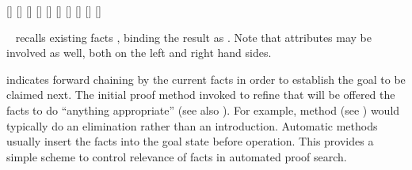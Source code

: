 \begin{isabellebody}
\begin{isamarkuptext}
  \begin{railoutput}
[]
\rail@plus
\rail@bar
{}
[]
\rail@endbar
{}[]
[]
\rail@endplus
\rail@end
{}
\rail@bar
{}[]
[]
[]
[]
\rail@endbar
\rail@plus
{}[]
[]
\rail@endplus
\rail@end
\end{railoutput}


  \begin{description}

  \item \hyperlink{command.note}{\mbox{}}~ recalls existing facts
  , binding the result as .  Note that
  attributes may be involved as well, both on the left and right hand
  sides.

  \item \hyperlink{command.then}{\mbox{}} indicates forward chaining by the current
  facts in order to establish the goal to be claimed next.  The
  initial proof method invoked to refine that will be offered the
  facts to do ``anything appropriate'' (see also
  ).  For example, method \hyperlink{method.Pure.rule}{\mbox{}}
  (see ) would typically do an elimination
  rather than an introduction.  Automatic methods usually insert the
  facts into the goal state before operation.  This provides a simple
  scheme to control relevance of facts in automated proof search.
  

\end{description}
\end{isamarkuptext}
\end{isabellebody}
